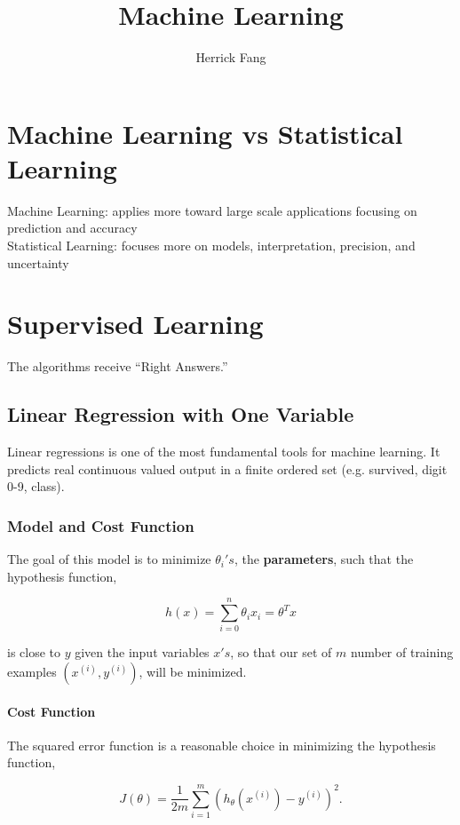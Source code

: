 \documentclass{article}
\title{Machine Learning}
\author{Herrick Fang}
\date{ }
\begin{document}
\maketitle

\tableofcontents

\section{Machine Learning vs Statistical Learning}
Machine Learning: applies more toward large scale applications focusing on prediction and accuracy
\\
Statistical Learning: focuses more on models, interpretation, precision, and uncertainty

\section{Supervised Learning}
The algorithms receive ``Right Answers.''   

\subsection{Linear Regression with One Variable}
Linear regressions is one of the most fundamental tools for machine learning. It predicts real continuous valued output in a finite ordered set (e.g. survived, digit 0-9, class).

\subsubsection{Model and Cost Function}
The goal of this model is to minimize $\theta_{i}'s$, the {\bf parameters}, such that the hypothesis function,

\begin{equation}
     \label{eq:hypothesis_function}
       h(x) = \sum_{i=0}^{n}\theta_i x_i = \theta^Tx
\end{equation}

is close to $y$ given the input variables $x's$, so that our set of $m$ number of training examples  $\left( x^{\left( i \right)}, y^{\left( i \right)} \right) $, will be minimized.

\paragraph{Cost Function}
The squared error function is a reasonable choice in minimizing the hypothesis function,

\begin{equation}
    \label{eq:cost_function}
    J(\theta) = \frac{1}{2m}\sum_{i=1}^{m}(h_\theta(x^{(i)}) - y^{(i)})^2.
\end{equation}
\end{document}
